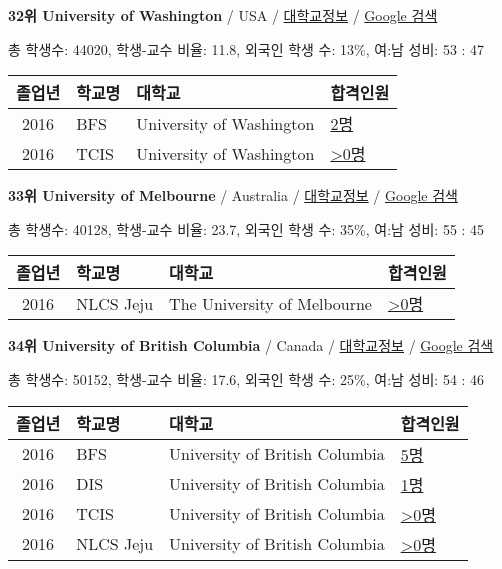 \documentclass[13pt,]{article}
\begin{document}
\textbf{32위 University of Washington} / USA /
\href{https://www.timeshighereducation.com/world-university-rankings/university-of-washington?ranking-dataset=133819}{대학교정보}
/ \href{http://www.google.com/search?q=University+of+Washington}{Google
검색}

총 학생수: 44020, 학생-교수 비율: 11.8, 외국인 학생 수: 13\%, 여:남
성비: 53 : 47

\begin{longtable}[]{@{}clll@{}}
\toprule
졸업년 & 학교명 & 대학교 & 합격인원\tabularnewline
\midrule
\endhead
2016 & BFS & University of Washington &
\href{http://cafe.naver.com/assarabia/11597}{2명}\tabularnewline
2016 & TCIS & University of Washington &
\href{http://cafe.naver.com/assarabia/11598}{\textgreater{}0명}\tabularnewline
\bottomrule
\end{longtable}

\textbf{33위 University of Melbourne} / Australia /
\href{https://www.timeshighereducation.com/world-university-rankings/university-of-melbourne?ranking-dataset=133819}{대학교정보}
/ \href{http://www.google.com/search?q=University+of+Melbourne}{Google
검색}

총 학생수: 40128, 학생-교수 비율: 23.7, 외국인 학생 수: 35\%, 여:남
성비: 55 : 45

\begin{longtable}[]{@{}clll@{}}
\toprule
졸업년 & 학교명 & 대학교 & 합격인원\tabularnewline
\midrule
\endhead
2016 & NLCS Jeju & The University of Melbourne &
\href{http://cafe.naver.com/assarabia/11592}{\textgreater{}0명}\tabularnewline
\bottomrule
\end{longtable}

\textbf{34위 University of British Columbia} / Canada /
\href{https://www.timeshighereducation.com/world-university-rankings/university-of-british-columbia?ranking-dataset=133819}{대학교정보}
/
\href{http://www.google.com/search?q=University+of+British+Columbia}{Google
검색}

총 학생수: 50152, 학생-교수 비율: 17.6, 외국인 학생 수: 25\%, 여:남
성비: 54 : 46

\begin{longtable}[]{@{}clll@{}}
\toprule
졸업년 & 학교명 & 대학교 & 합격인원\tabularnewline
\midrule
\endhead
2016 & BFS & University of British Columbia &
\href{http://cafe.naver.com/assarabia/11597}{5명}\tabularnewline
2016 & DIS & University of British Columbia &
\href{http://cafe.naver.com/assarabia/11591}{1명}\tabularnewline
2016 & TCIS & University of British Columbia &
\href{http://cafe.naver.com/assarabia/11598}{\textgreater{}0명}\tabularnewline
2016 & NLCS Jeju & University of British Columbia &
\href{http://cafe.naver.com/assarabia/11592}{\textgreater{}0명}\tabularnewline
\bottomrule
\end{longtable}
\end{document}
